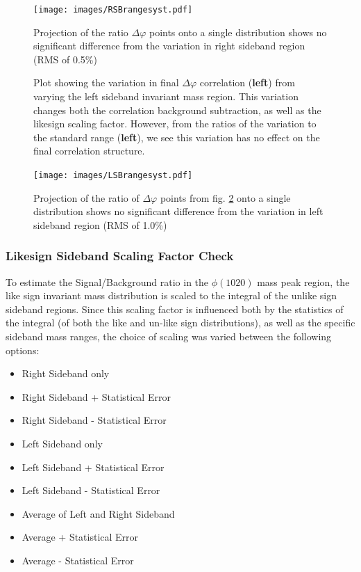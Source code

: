 \documentclass[ALICE,manyauthors]{ALICE_analysis_notes}
\begin{document}
\begin{itemize}
\begin{figure}[ht]
\centering
\texttt{[image: images/RSBrangesyst.pdf]}
\caption{Projection of the ratio $\Delta\varphi$ points onto a single distribution shows no significant difference from the variation in right sideband region (RMS of 0.5\%)}
\label{RSBRMS}
\end{figure}

\begin{figure}[ht]
\centering
\begin{subfigure}{
\texttt{[image: images/LSBrangedphi.pdf]}}
\end{subfigure}
\begin{subfigure}{
\texttt{[image: images/LSBrangeratio.pdf]}}
\end{subfigure}
\caption{Plot showing the variation in final $\Delta\varphi$ correlation (\textbf{left}) from varying the left sideband invariant mass region.  This variation changes both the correlation background subtraction, as well as the likesign scaling factor. However, from the ratios of the variation to the standard range (\textbf{left}), we see this variation has no effect on the final correlation structure.}
\label{LSBcheck}
\end{figure}

\begin{figure}[ht]
\centering
\texttt{[image: images/LSBrangesyst.pdf]}
\caption{Projection of the ratio of $\Delta\varphi$ points from fig. \ref{LSBcheck} onto a single distribution shows no significant difference from the variation in left sideband region (RMS of 1.0\%)}
\label{LSBRMS}
\end{figure}

\subsubsection{Likesign Sideband Scaling Factor Check}

To estimate the Signal/Background ratio in the $\phi(1020)$ mass peak region, the like sign invariant mass distribution is scaled to the integral of the unlike sign sideband regions. Since this scaling factor is influenced both by the statistics of the integral (of both the like and un-like sign distributions), as well as the specific sideband mass ranges, the choice of scaling was varied between the following options:

\begin{itemize}
    \item Right Sideband only
    \item Right Sideband + Statistical Error
    \item Right Sideband - Statistical Error
    \item Left Sideband only
    \item Left Sideband + Statistical Error
    \item Left Sideband - Statistical Error
    \item Average of Left and Right Sideband
    \item Average + Statistical Error
    \item Average - Statistical Error
\end{itemize}


\end{itemize}
\end{document}
